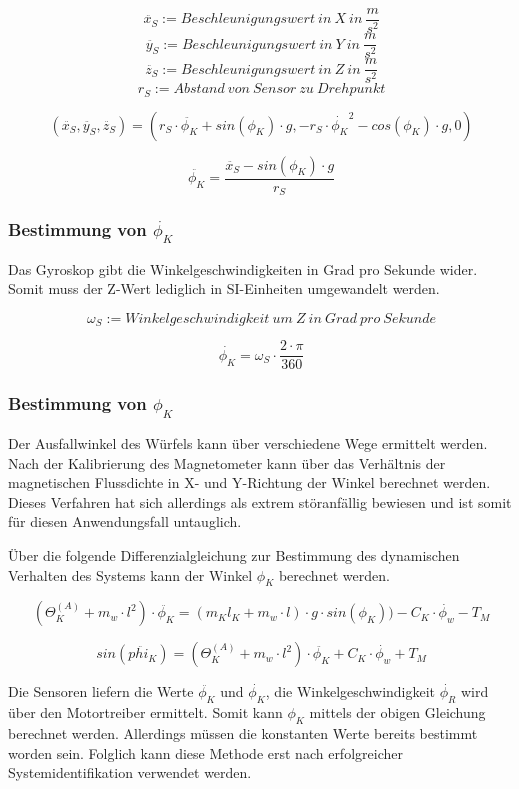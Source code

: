 \documentclass{article}
\begin{document}
\[\ \ddot{x_S} := Beschleunigungswert \ in \ X \ in \ \frac{m}{s^2} \]
\[\ \ddot{y_S} := Beschleunigungswert \ in \ Y \ in \ \frac{m}{s^2} \]
\[\ \ddot{z_S} := Beschleunigungswert \ in \ Z \ in \ \frac{m}{s^2} \]
\[\ r_S := Abstand \ von  \ Sensor \ zu \ Drehpunkt \]

\[\ (\ddot{x_S}, \ddot{y_S}, \ddot{z_S}) = (r_S \cdot \ddot{\phi_K} + sin(\phi_K) \cdot g , -r_S \cdot {\dot{\phi_K}}^2 - cos(\phi_K) \cdot g , 0) \]

\[\ \ddot{\phi_K} = \frac{\ddot{x_S} - sin(\phi_K) \cdot g }{r_S} \]

\subsubsection{Bestimmung von $\dot{\phi_K}$}
Das Gyroskop gibt die Winkelgeschwindigkeiten in Grad pro Sekunde wider. Somit muss der Z-Wert lediglich in SI-Einheiten umgewandelt werden.

\[\ {\omega_S} := Winkelgeschwindigkeit \ um \ Z \ in \ Grad \ pro \ Sekunde \]

\[\ \dot{\phi_K} = {\omega_S} \cdot \frac{2 \cdot \pi}{360} \]

\subsubsection{Bestimmung von $\phi_K$}
Der Ausfallwinkel des Würfels kann über verschiedene Wege ermittelt werden. Nach der Kalibrierung des Magnetometer kann über das Verhältnis der magnetischen Flussdichte in X- und Y-Richtung der Winkel berechnet werden. Dieses Verfahren hat sich allerdings als extrem störanfällig bewiesen und ist somit für diesen Anwendungsfall untauglich.

Über die folgende Differenzialgleichung zur Bestimmung des dynamischen Verhalten des Systems kann der Winkel $\phi_K$ berechnet werden.

\[\ (\Theta_K^{(A)} + m_w \cdot l^2) \cdot \ddot{\phi_K} = (m_K  l_K + m_w \cdot l) \cdot g \cdot sin(\phi_K)) - C_K \cdot \dot{\phi_w} - T_M  \]

\[\ sin(\ddot{phi_K}) = (\Theta_K^{(A)} + m_w \cdot l^2) \cdot \ddot{\phi_K} + C_K \cdot \dot{\phi_w} + T_M \]

Die Sensoren liefern die Werte $\ddot{\phi_K}$ und $\dot{\phi_K}$, die Winkelgeschwindigkeit $\dot{\phi_R}$ wird über den Motortreiber ermittelt. Somit kann $\phi_K$ mittels der obigen Gleichung berechnet werden. Allerdings müssen die konstanten Werte bereits bestimmt worden sein. Folglich kann diese Methode erst nach erfolgreicher Systemidentifikation verwendet werden.
\end{document}
